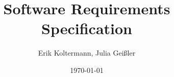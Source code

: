 \title{Software Requirements Specification}
\author{Erik Koltermann, Julia Geißler}
\date{\today}
\maketitle